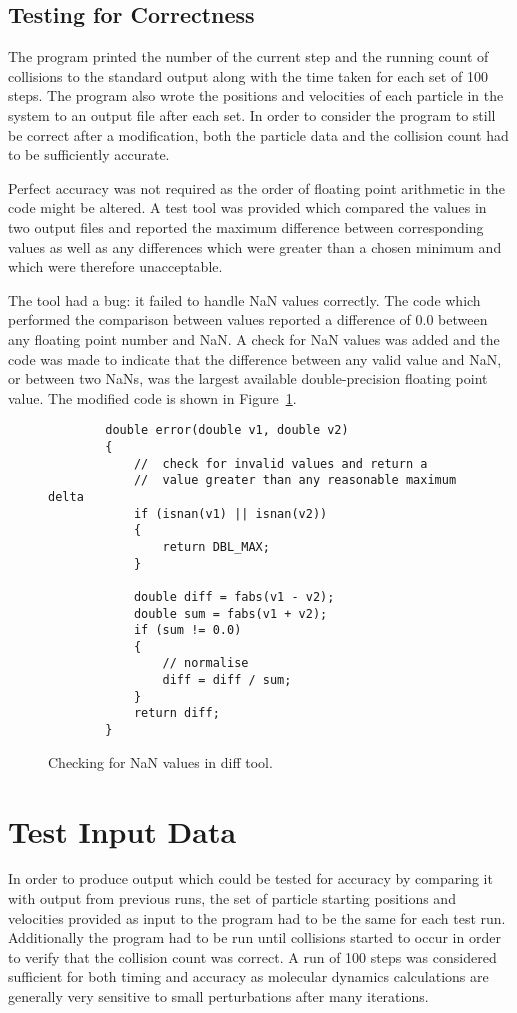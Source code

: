 \documentclass[11pt, oneside]{article}   %
\begin{document}
\subsection{Testing for Correctness}

The program printed the number of the current step and the running count of collisions to the standard output along with the time taken for each set of 100 steps.
The program also wrote the positions and velocities of each particle in the system to an output file after each set.
In order to consider the program to still be correct after a modification, both the particle data and the collision count had to be sufficiently accurate.  

Perfect accuracy was not required as the order of floating point arithmetic in the code might be altered.
A test tool was provided which compared the values in two output files and reported the maximum difference between corresponding values as well as any differences which were greater than a chosen minimum and which were therefore unacceptable.  

The tool had a bug: it failed to handle NaN values correctly.
The code which performed the comparison between values reported a difference of 0.0 between any floating point number and NaN.
A check for NaN values was added and the code was made to indicate that the difference between any valid value and NaN, or between two NaNs, was the largest available double-precision floating point value.
The modified code is shown in Figure~\ref{fig:NanTest}.

\begin{figure}
	\begin{lstlisting}
		double error(double v1, double v2)
		{
			//  check for invalid values and return a 
			//  value greater than any reasonable maximum delta
			if (isnan(v1) || isnan(v2))
			{
				return DBL_MAX;
			}

			double diff = fabs(v1 - v2);
			double sum = fabs(v1 + v2);
			if (sum != 0.0)
			{
				// normalise
				diff = diff / sum;
			}
			return diff;
		}
	\end{lstlisting}
	\caption{Checking for NaN values in diff tool.}
	\label{fig:NanTest}
\end{figure}

\section{Test Input Data}

In order to produce output which could be tested for accuracy by comparing it with output from previous runs, the set of particle starting positions and velocities provided as input to the program had to be the same for each test run.
Additionally the program had to be run until collisions started to occur in order to verify that the collision count was correct.
A run of 100 steps was considered sufficient for both timing and accuracy as molecular dynamics calculations are generally very sensitive to small perturbations after many iterations.  
\end{document}
